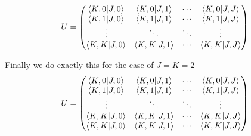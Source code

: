 \documentclass[11pt]{article} %
\begin{document}
\begin{equation}
U=\begin{pmatrix} 
\braket{K,0|J,0}&\braket{K,0|J,1}& \cdots & \braket{K,0|J,J}\\
\braket{K,1|J,0}&\braket{K,1|J,1}& \cdots & \braket{K,1|J,J}\\
\vdots &\ddots & \ddots & \vdots \\
\braket{K,K|J,0}&\braket{K,K|J,1}& \cdots & \braket{K,K|J,J}\\
\end{pmatrix}
\end{equation}


Finally we do exactly this for the case of $J=K=2$\\

\begin{equation}
U=\begin{pmatrix} 
\braket{K,0|J,0}&\braket{K,0|J,1}&  \cdots &    \braket{K,0|J,J}\\
\braket{K,1|J,0}&\braket{K,1|J,1}& \cdots & \braket{K,1|J,J}\\
\vdots &\ddots & \ddots & \vdots \\
\braket{K,K|J,0}&\braket{K,K|J,1}& \cdots & \braket{K,K|J,J}\\
\braket{K,K|J,0}&\braket{K,K|J,1}& \cdots & \braket{K,K|J,J}\\
\end{pmatrix}
\end{equation}


	
 
\end{document}
